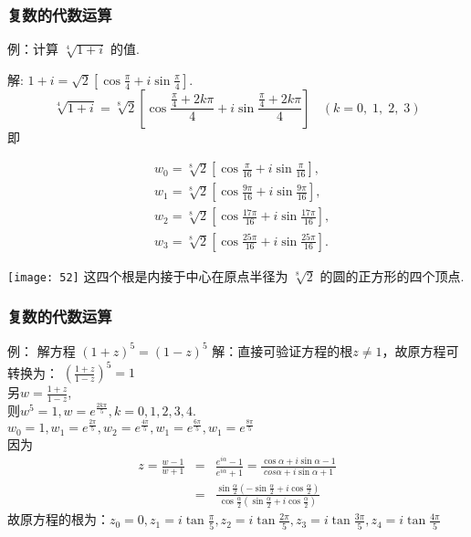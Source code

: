 \documentclass{beamer}
\begin{document}
\begin{frame}[t]
\frametitle{复数的代数运算}
\begin{exampleblock}{例：计算 $ \sqrt[{{4}}]{{1 + i}} $ 的值.}

解:  $ 1 + i = \sqrt 2 \left[ {\cos \frac{\pi }{4} + i\sin \frac{\pi }{4}} \right] $. 
$$\sqrt[4]{{1 + i}} = \sqrt[8]{2}\left[ {\cos \frac{{\frac{\pi }{4} + 2k\pi }}{4} + i\sin \frac{{\frac{\pi }{4} + 2k\pi }}{4}} \right]~~~~
(k = 0, \; 1, \; 2, \; 3)$$
即\begin{minipage}{0.55\linewidth}

\begin{align*}
&{w_0} = \sqrt[8]{2}\left[ {\cos \frac{\pi }{{16}} + i\sin \frac{\pi }{{16}}} \right], \\
&{w_1} = \sqrt[8]{2}\left[ {\cos \frac{{9\pi }}{{16}} + i\sin \frac{{9\pi }}{{16}}} \right], \\
&{w_2} = \sqrt[8]{2}\left[ {\cos \frac{{17\pi }}{{16}} + i\sin \frac{{17\pi }}{{16}}} \right], \\
&{w_3} = \sqrt[8]{2}\left[ {\cos \frac{{25\pi }}{{16}} + i\sin \frac{{25\pi }}{{16}}} \right].
\end{align*}
\end{minipage}\qquad
\begin{minipage}{0.35\linewidth}
\texttt{[image: 52]}
这四个根是内接于中心在原点半径为 $ \sqrt[{8}]{{2}} $ 的圆的正方形的四个顶点.
\end{minipage}
\end{exampleblock}

\end{frame}


\begin{frame}[t]
\frametitle{复数的代数运算}
\begin{exampleblock}{例： 解方程 $(1+z)^5 = (1-z)^5 $}
解：直接可验证方程的根$z \neq 1$，故原方程可转换为：
$ \left( \frac{1+z}{1-z}\right)^5 = 1 $\\
另$w = \frac{1+z}{1-z}$,\\
则$w^5 = 1, w = e^{\frac{2k\pi}{5}}, k = 0, 1, 2, 3, 4$.\\
$w_0 = 1, w_1 = e^{\frac{2\pi}{5}}, w_2 = e^{\frac{4\pi}{5}}, w_1 = e^{\frac{6\pi}{5}},w_1 = e^{\frac{8\pi}{5}}$\\
因为
\begin{eqnarray*}
z = \frac{w-1}{w+1} & = & \frac{e^{i \alpha}-1}{e^{i \alpha}+1} = \frac{\cos{\alpha}+i\sin{\alpha}-1}{cos{\alpha}+i\sin{\alpha}+1}\\
& = & \frac{\sin{\frac{\alpha}{2}}(-\sin{\frac{\alpha}{2}}+i\cos{\frac{\alpha}{2}})}{\cos{\frac{\alpha}{2}}(\sin{\frac{\alpha}{2}}+i\cos{\frac{\alpha}{2}})}
\end{eqnarray*}
故原方程的根为：$z_0 = 0, z_1 = i \tan{\frac{\pi}{5}}, z_2 = i \tan{\frac{2\pi}{5}}, z_3 = i \tan{\frac{3\pi}{5}}, z_4 = i \tan{\frac{4\pi}{5}}$
\end{exampleblock}
\end{frame}
\end{document}
